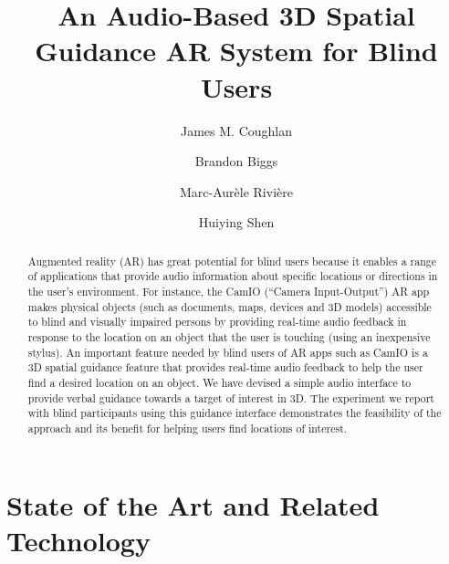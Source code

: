 \documentclass[runningheads]{res/templates/llncs}
\begin{document}
\title{An Audio-Based 3D Spatial Guidance AR System for Blind Users}


\author{James M. Coughlan \and
Brandon Biggs \and
Marc-Aurèle Rivière \and
Huiying Shen}


%
\maketitle %
%
\begin{abstract}
Augmented reality (AR) has great potential for blind users because it
enables a range of applications that provide audio information about
specific locations or directions in the user's environment. For
instance, the CamIO (``Camera Input-Output'') AR app makes physical
objects (such as documents, maps, devices and 3D models) accessible to
blind and visually impaired persons by providing real-time audio
feedback in response to the location on an object that the user is
touching (using an inexpensive stylus). An important feature needed by
blind users of AR apps such as CamIO is a 3D spatial guidance feature
that provides real-time audio feedback to help the user find a desired
location on an object. We have devised a simple audio interface to
provide verbal guidance towards a target of interest in 3D. The
experiment we report with blind participants using this guidance
interface demonstrates the feasibility of the approach and its benefit
for helping users find locations of interest.

\end{abstract}
%

\hypertarget{sota}{%
\section{State of the Art and Related Technology}\label{sota}}
\end{document}
